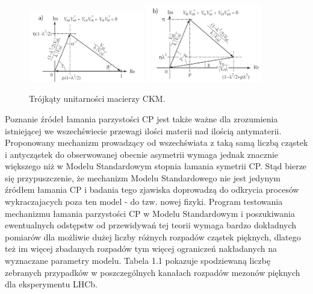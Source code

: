 \documentclass{pracamgr}
\begin{document}
\begin{figure}[h!]
 \centering
 \includegraphics[width=0.45\textwidth]{rysunki/introduction/trojkat1.png}
 \includegraphics[width=0.45\textwidth]{rysunki/introduction/trojkat2.png}
 \caption{Trójkąty unitarności macierzy CKM.}
\end{figure}

\noindent Poznanie źródeł łamania parzystości CP jest także ważne dla zrozumienia istniejącej we wszechświecie przewagi ilości materii nad ilością antymaterii. Proponowany mechanizm prowadzący od wszechświata z taką samą liczbą cząstek i antycząstek do obserwowanej obecnie asymetrii wymaga jednak znacznie większego niż w Modelu Standardowym stopnia łamania symetrii CP. Stąd bierze się przypuszczenie, że mechanizm Modelu Standardowego nie jest jedynym źródłem łamania CP i badania tego zjawiska doprowadzą do odkrycia procesów wykraczajacych poza ten model - do tzw. nowej fizyki. Program testowania mechanizmu łamania parzystości CP w Modelu Standardowym i poszukiwania ewentualnych odstępstw od przewidywań tej teorii wymaga bardzo dokładnych pomiarów dla możliwie dużej liczby różnych rozpadów cząstek pięknych, dlatego też im więcej zbadanych rozpadów tym więcej ograniczeń nakładanych na wyznaczane parametry modelu. Tabela 1.1 pokazuje spodziewaną liczbę zebranych przypadków w poszczególnych kanałach rozpadów mezonów pięknych dla eksperymentu LHCb.
\end{document}
